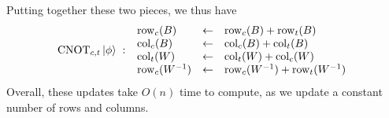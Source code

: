 Putting together these two pieces, we thus have
\begin{equation}
\text{CNOT}_{c,t}\ket{\phi} \;:\;
\begin{array}{lcl} 
\mathrm{row}_{c}(B) &\gets& \mathrm{row}_{c}(B)+\mathrm{row}_{t}(B)  \\
\mathrm{col}_{c}(B) &\gets& \mathrm{col}_{c}(B)+\mathrm{col}_{t}(B)  \\
\mathrm{col}_{t}(W) &\gets& \mathrm{col}_{t}(W) + \mathrm{col}_{c}(W)  \\
\mathrm{row}_{c}(W^{-1}) &\gets &\mathrm{row}_{c}(W^{-1}) + \mathrm{row}_{t}(W^{-1})
\end{array}
\end{equation}
Overall, these updates take $O(n)$ time to compute, as we update a constant number of rows and columns.\par
